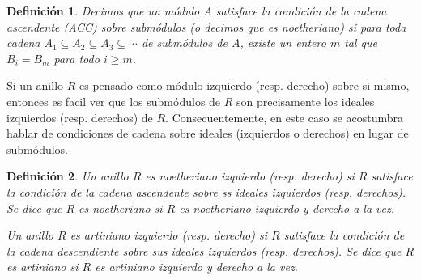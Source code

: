 \documentclass{report}
\newtheorem{definition}{Definición}
\begin{document}
  \begin{definition}
    Decimos que un módulo \(A\) satisface la \emph{condición de la cadena ascendente (ACC) sobre submódulos} (o decimos que es \emph{noetheriano}) si para toda cadena \(A_1 \subseteq A_2 \subseteq A_3 \subseteq \cdots\) de submódulos de \(A\), existe un entero \(m\) tal que \(B_i = B_m\) para todo \(i \geq m\).
  \end{definition}

  Si un anillo \(R\) es pensado como módulo izquierdo (resp. derecho) sobre si mismo, entonces es facil ver que los submódulos de \(R\) son precisamente los ideales izquierdos (resp. derechos) de \(R\).
  Consecuentemente, en este caso se acostumbra hablar de condiciones de cadena sobre ideales (izquierdos o derechos) en lugar de submódulos.

  \begin{definition}
    Un anillo \(R\) es \emph{noetheriano izquierdo} (resp. \emph{derecho}) si \(R\) satisface la condición de la cadena ascendente sobre ss ideales izquierdos (resp. derechos).
    Se dice que \(R\) es \emph{noetheriano} si \(R\) es noetheriano izquierdo y derecho a la vez.

    Un anillo \(R\) es \emph{artiniano izquierdo} (resp. \emph{derecho}) si \(R\) satisface la condición de la cadena descendiente sobre sus ideales izquierdos (resp. derechos).
    Se dice que \(R\) es artiniano si \(R\) es artiniano izquierdo y derecho a la vez.
  \end{definition}
\end{document}
